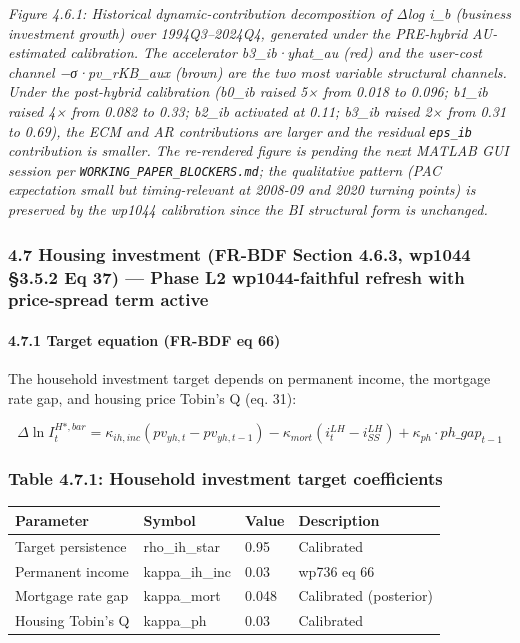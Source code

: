 \documentclass[
]{article}
\newcounter{none} %
\begin{document}
\emph{Figure 4.6.1: Historical dynamic-contribution decomposition of
Δlog i\_b (business investment growth) over 1994Q3--2024Q4, generated
under the PRE-hybrid AU-estimated calibration. The accelerator
b3\_ib·yhat\_au (red) and the user-cost channel −σ·pv\_rKB\_aux (brown)
are the two most variable structural channels. Under the post-hybrid
calibration (b0\_ib raised 5× from 0.018 to 0.096; b1\_ib raised 4× from
0.082 to 0.33; b2\_ib activated at 0.11; b3\_ib raised 2× from 0.31 to
0.69), the ECM and AR contributions are larger and the residual
\texttt{eps\_ib} contribution is smaller. The re-rendered figure is
pending the next MATLAB GUI session per
\texttt{WORKING\_PAPER\_BLOCKERS.md}; the qualitative pattern (PAC
expectation small but timing-relevant at 2008-09 and 2020 turning
points) is preserved by the wp1044 calibration since the BI structural
form is unchanged.}

\subsubsection{4.7 Housing investment (FR-BDF Section 4.6.3, wp1044
§3.5.2 Eq 37) --- Phase L2 wp1044-faithful refresh with price-spread
term
active}\label{housing-investment-fr-bdf-section-4.6.3-wp1044-3.5.2-eq-37-phase-l2-wp1044-faithful-refresh-with-price-spread-term-active}

\paragraph{4.7.1 Target equation (FR-BDF eq
66)}\label{target-equation-fr-bdf-eq-66}

The household investment target depends on permanent income, the
mortgage rate gap, and housing price Tobin's Q (eq. 31):

\[\Delta \ln I^{H*,bar}_t = \kappa_{ih,inc} (pv_{yh,t} - pv_{yh,t-1}) - \kappa_{mort} (i^{LH}_t - i^{LH}_{SS}) + \kappa_{ph} \cdot ph\_gap_{t-1}\]

\subsubsection{Table 4.7.1: Household investment target
coefficients}\label{table-4.7.1-household-investment-target-coefficients}

{\def\LTcaptype{none} %
\begin{longtable}[]{@{}llll@{}}
\toprule\noalign{}
Parameter & Symbol & Value & Description \\
\midrule\noalign{}
\endhead
\bottomrule\noalign{}
\endlastfoot
Target persistence & rho\_ih\_star & 0.95 & Calibrated \\
Permanent income & kappa\_ih\_inc & 0.03 & wp736 eq 66 \\
Mortgage rate gap & kappa\_mort & 0.048 & Calibrated (posterior) \\
Housing Tobin's Q & kappa\_ph & 0.03 & Calibrated \\
\end{longtable}
}
\end{document}
